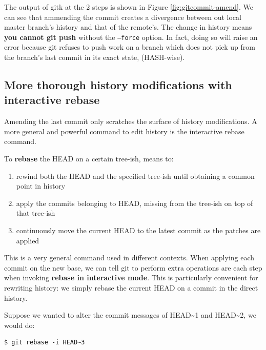 \documentclass{../common/tufte-latex/tufte-handout}
\begin{document}
The output of gitk at the 2 steps is shown in Figure \ref{fig:gitcommit-amend}.
We can see that ammending the commit creates a divergence between out local master branch's history and that of the remote's.
The change in history means \textbf{you cannot git push} without the \texttt{--force} option. 
In fact, doing so will raise an error because git refuses to push work on a branch which does not pick up from the branch's last commit in its exact state, (HASH-wise).

\subsection{More thorough history modifications with interactive rebase}
Amending the last commit only scratches the surface of history modifications.
A more general and powerful command to edit history is the interactive rebase command.

To \textbf{rebase} the HEAD on a certain tree-ish, means to:

\begin{enumerate} 
 \item{rewind both the HEAD and the specified tree-ish until obtaining a common point in history}
 \item{apply the commits belonging to HEAD, missing from the tree-ish on top of that tree-ish}
 \item{continuously move the current HEAD to the latest commit as the patches are applied}
\end{enumerate}

This is a very general command used in different contexts.
When applying each commit on the new base, we can tell git to perform extra operations are each step when invoking \textbf{rebase in interactive mode}.
This is particularly convenient for rewriting history: we simply rebase the current HEAD on a commit in the direct history.

Suppose we wanted to alter the commit messages of HEAD\textasciitilde1 and HEAD\textasciitilde2, we would do:
\begin{lstlisting}[style=BashInputStyle]
  $ git rebase -i HEAD~3
\end{lstlisting}
\end{document}
